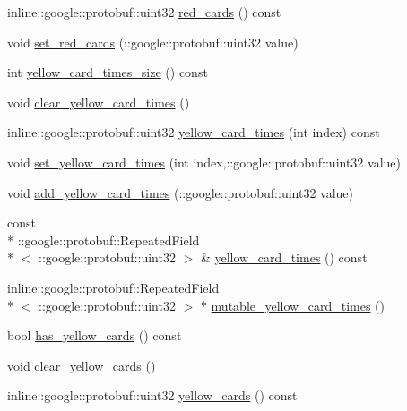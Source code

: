\begin{DoxyCompactItemize}
\item 
inline\-::google\-::protobuf\-::uint32 \hyperlink{class_s_s_l___referee___team_info_a56a77c6aefa2c8c79a16e5f7bfe8ba74}{red\-\_\-cards} () const 
\item 
void \hyperlink{class_s_s_l___referee___team_info_a887c84d16d522450bc0435edf87a30a5}{set\-\_\-red\-\_\-cards} (\-::google\-::protobuf\-::uint32 value)
\item 
int \hyperlink{class_s_s_l___referee___team_info_af17e9afe5d5415a652f8541405dabc59}{yellow\-\_\-card\-\_\-times\-\_\-size} () const 
\item 
void \hyperlink{class_s_s_l___referee___team_info_afdcc60f2390cf34d51d624393f241903}{clear\-\_\-yellow\-\_\-card\-\_\-times} ()
\item 
inline\-::google\-::protobuf\-::uint32 \hyperlink{class_s_s_l___referee___team_info_a7bdc4369054286895efd698164035b28}{yellow\-\_\-card\-\_\-times} (int index) const 
\item 
void \hyperlink{class_s_s_l___referee___team_info_a6e127646aed814cee21528bd6b390995}{set\-\_\-yellow\-\_\-card\-\_\-times} (int index,\-::google\-::protobuf\-::uint32 value)
\item 
void \hyperlink{class_s_s_l___referee___team_info_ad07a8f6f2ff38be7920bfa0017822d47}{add\-\_\-yellow\-\_\-card\-\_\-times} (\-::google\-::protobuf\-::uint32 value)
\item 
const \\*
\-::google\-::protobuf\-::\-Repeated\-Field\\*
$<$ \-::google\-::protobuf\-::uint32 $>$ \& \hyperlink{class_s_s_l___referee___team_info_abe9395bcd901d1c04b5e08dfad6f8af5}{yellow\-\_\-card\-\_\-times} () const 
\item 
inline\-::google\-::protobuf\-::\-Repeated\-Field\\*
$<$ \-::google\-::protobuf\-::uint32 $>$ $\ast$ \hyperlink{class_s_s_l___referee___team_info_abb0c60ee50ad443a0c01a8e08e1560cf}{mutable\-\_\-yellow\-\_\-card\-\_\-times} ()
\item 
bool \hyperlink{class_s_s_l___referee___team_info_a8b7a07a899723f59aac34b4c24b49363}{has\-\_\-yellow\-\_\-cards} () const 
\item 
void \hyperlink{class_s_s_l___referee___team_info_a9724e0aa2ff7093a52cdbf221431662b}{clear\-\_\-yellow\-\_\-cards} ()
\item 
inline\-::google\-::protobuf\-::uint32 \hyperlink{class_s_s_l___referee___team_info_a14397ce48528adf9b6c6d40f8e2fee5c}{yellow\-\_\-cards} () const 
\item 

\end{DoxyCompactItemize}
